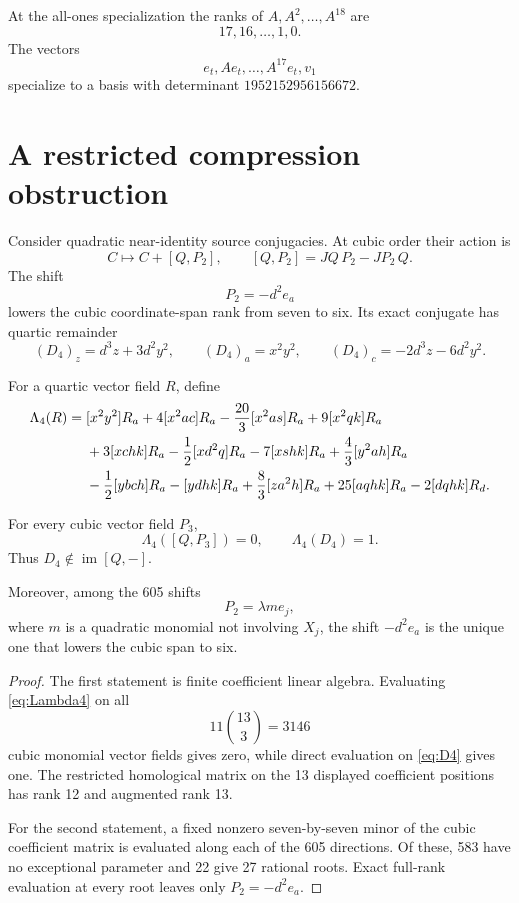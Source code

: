\documentclass[11pt,reqno]{amsart}
\begin{document}
\begin{remark}
At the all-ones specialization the ranks of
\(A,A^2,\ldots,A^{18}\) are
\[
17,16,\ldots,1,0.
\]
The vectors
\[
e_t,Ae_t,\ldots,A^{17}e_t,v_1
\]
specialize to a basis with determinant \(1952152956156672\).
\end{remark}

\section{A restricted compression obstruction}
\label{sec:compression}

Consider quadratic near-identity source conjugacies.  At cubic order their
action is
\[
C\longmapsto C+[Q,P_2],
\qquad
[Q,P_2]=JQ\,P_2-JP_2\,Q.
\]
The shift
\[
P_2=-d^2e_a
\]
lowers the cubic coordinate-span rank from seven to six.  Its exact conjugate
has quartic remainder
\begin{equation}
\label{eq:D4}
(D_4)_z=d^3z+3d^2y^2,\qquad
(D_4)_a=x^2y^2,\qquad
(D_4)_c=-2d^3z-6d^2y^2.
\end{equation}

For a quartic vector field \(R\), define
\begin{align}
\Lambda_4(R)={}&
[x^2y^2]R_a+4[x^2ac]R_a-\frac{20}{3}[x^2as]R_a
+9[x^2qk]R_a\notag\\
&+3[xchk]R_a-\frac12[xd^2q]R_a-7[xshk]R_a
+\frac43[y^2ah]R_a\notag\\
&-\frac12[ybch]R_a-[ydhk]R_a+\frac83[za^2h]R_a
+25[aqhk]R_a-2[dqhk]R_d.
\label{eq:Lambda4}
\end{align}

\begin{proposition}
\label{prop:compression}
For every cubic vector field \(P_3\),
\[
\Lambda_4([Q,P_3])=0,
\qquad
\Lambda_4(D_4)=1.
\]
Thus \(D_4\notin\operatorname{im}[Q,-]\).

Moreover, among the 605 shifts
\[
P_2=\lambda m e_j,
\]
where \(m\) is a quadratic monomial not involving \(X_j\), the shift
\(-d^2e_a\) is the unique one that lowers the cubic span to six.
\end{proposition}

\begin{proof}
The first statement is finite coefficient linear algebra.  Evaluating
\eqref{eq:Lambda4} on all
\[
11\binom{13}{3}=3146
\]
cubic monomial vector fields gives zero, while direct evaluation on
\eqref{eq:D4} gives one.  The restricted homological matrix on the 13
displayed coefficient positions has rank 12 and augmented rank 13.

For the second statement, a fixed nonzero seven-by-seven minor of the cubic
coefficient matrix is evaluated along each of the 605 directions.  Of these,
583 have no exceptional parameter and 22 give 27 rational roots.  Exact
full-rank evaluation at every root leaves only \(P_2=-d^2e_a\).
\end{proof}
\end{document}

